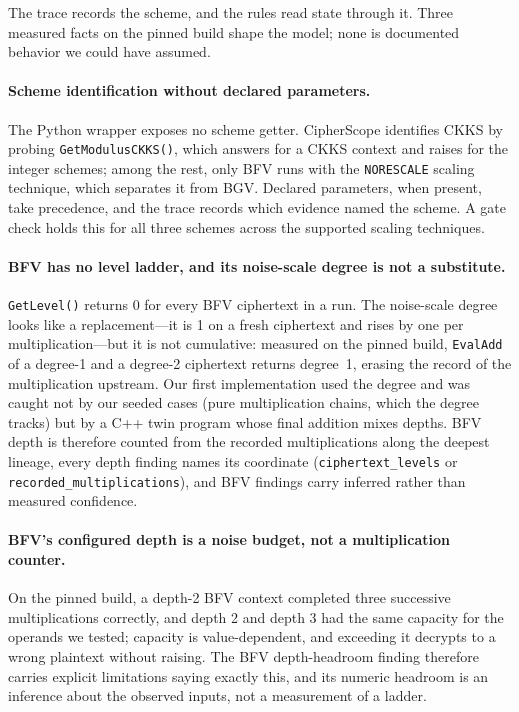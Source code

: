 \documentclass[sigconf,nonacm]{acmart}
\begin{document}
The trace records the scheme, and the rules read state through it. Three
measured facts on the pinned build shape the model; none is documented
behavior we could have assumed.

\paragraph{Scheme identification without declared parameters.} The Python
wrapper exposes no scheme getter. CipherScope identifies CKKS by probing
\texttt{GetModulusCKKS()}, which answers for a CKKS context and raises for
the integer schemes; among the rest, only BFV runs with the
\texttt{NORESCALE} scaling technique, which separates it from BGV. Declared
parameters, when present, take precedence, and the trace records which
evidence named the scheme. A gate check holds this for all three schemes
across the supported scaling techniques.

\paragraph{BFV has no level ladder, and its noise-scale degree is not a
substitute.} \texttt{GetLevel()} returns 0 for every BFV ciphertext in a
run. The noise-scale degree looks like a replacement---it is 1 on a fresh
ciphertext and rises by one per multiplication---but it is not cumulative:
measured on the pinned build, \texttt{EvalAdd} of a degree-1 and a degree-2
ciphertext returns degree~1, erasing the record of the multiplication
upstream. Our first implementation used the degree and was caught not by our
seeded cases (pure multiplication chains, which the degree tracks) but by a
C++ twin program whose final addition mixes depths. BFV depth is therefore
counted from the recorded multiplications along the deepest lineage, every
depth finding names its coordinate (\texttt{ciphertext\_levels} or
\texttt{recorded\_multiplications}), and BFV findings carry inferred rather
than measured confidence.

\paragraph{BFV's configured depth is a noise budget, not a multiplication
counter.} On the pinned build, a depth-2 BFV context completed three
successive multiplications correctly, and depth 2 and depth 3 had the same
capacity for the operands we tested; capacity is value-dependent, and
exceeding it decrypts to a wrong plaintext without raising. The BFV
depth-headroom finding therefore carries explicit limitations saying exactly
this, and its numeric headroom is an inference about the observed inputs,
not a measurement of a ladder.
\end{document}
